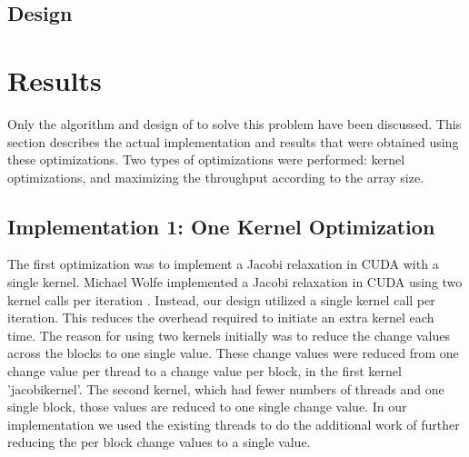 \documentclass[10pt]{article}
\begin{document}
\begin{multicols}{2}
    \subsection{Design} %

\section{Results} %
Only the algorithm and design of to solve this problem have been discussed.
This section describes the actual implementation and results that were obtained using these optimizations.
Two types of optimizations were performed: kernel optimizations, and maximizing the throughput according to the array size.
    \subsection{Implementation 1: One Kernel Optimization}
    The first optimization was to implement a Jacobi relaxation in CUDA with a single kernel.
    Michael Wolfe implemented a Jacobi relaxation in CUDA using two kernel calls per iteration \cite{michael}.
    Instead, our design utilized a single kernel call per iteration.
    This reduces the overhead required to initiate an extra kernel each time.
    The reason for using two kernels initially was to reduce the change values across the blocks to one single value.
    These change values were reduced from one change value per thread to a change value per block, in the first kernel 'jacobikernel'.
    The second kernel, which had fewer numbers of threads and one single block, those values are reduced to one single change value.
    In our implementation we used the existing threads to do the additional work of further reducing the per block change values to a single value.

\end{multicols}
\end{document}
